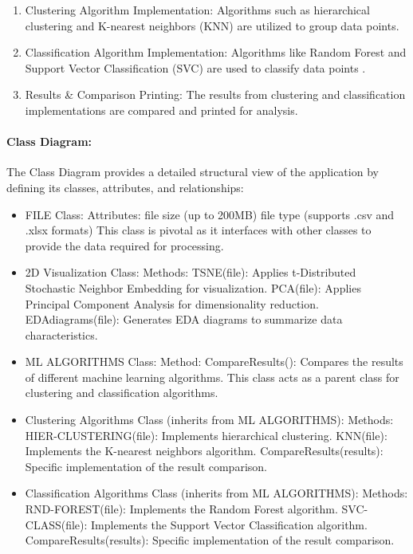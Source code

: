 \documentclass[unnumsec,webpdf,contemporary,large]{oup-authoring-template}%
\theoremstyle{thmstyleone}%
\theoremstyle{thmstyletwo}%
\theoremstyle{thmstylethree}%
\begin{document}
\begin{enumerate}
    \item
    Clustering Algorithm Implementation: Algorithms such as hierarchical clustering and K-nearest neighbors (KNN) are utilized to group data points.
    \vspace{0.2cm}
    \item Classification Algorithm Implementation: Algorithms like Random Forest and Support Vector Classification (SVC) are used to classify data points
    \vspace{0.2cm}.
    \item Results \& Comparison Printing: The results from clustering and classification implementations are compared and printed for analysis.
\end{enumerate}

\paragraph{Class Diagram:}
\vspace{0.2cm}

The Class Diagram provides a detailed structural view of the application by defining its classes, attributes, and relationships:
\vspace{0.2cm}

\begin{itemize}
    \item FILE Class:
    Attributes:
        file size (up to 200MB)
        file type (supports .csv and .xlsx formats)
    This class is pivotal as it interfaces with other classes to provide the data required for processing.
    \vspace{0.2cm}
    \item 2D Visualization Class:
    Methods:
        TSNE(file): Applies t-Distributed Stochastic Neighbor Embedding for visualization.
        PCA(file): Applies Principal Component Analysis for dimensionality reduction.
        EDAdiagrams(file): Generates EDA diagrams to summarize data characteristics.
    \vspace{0.2cm}
    \item ML ALGORITHMS Class:
    Method:
        CompareResults(): Compares the results of different machine learning algorithms.
    This class acts as a parent class for clustering and classification algorithms.
    \item Clustering Algorithms Class (inherits from ML ALGORITHMS):
    Methods:
        HIER-CLUSTERING(file): Implements hierarchical clustering.
        KNN(file): Implements the K-nearest neighbors algorithm.
        CompareResults(results): Specific implementation of the result comparison.
    \vspace{0.2cm}
    \item Classification Algorithms Class (inherits from ML ALGORITHMS):
    Methods:
        RND-FOREST(file): Implements the Random Forest algorithm.
        SVC-CLASS(file): Implements the Support Vector Classification algorithm.
        CompareResults(results): Specific implementation of the result comparison.
\end{itemize}
\vspace{0.2cm}
\end{document}
